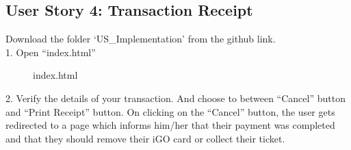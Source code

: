 \documentclass[12pt]{report}
\begin{document}
\FloatBarrier
\subsection{User Story 4: Transaction Receipt}
Download the folder ‘US\_Implementation’ from the github link. \\

1.	Open “index.html”
\begin{figure}[H]
	\caption{\label{fig:index}index.html}	
\end{figure}


2.	Verify the details of your transaction. And choose to between “Cancel” button and “Print Receipt” button. On clicking on the “Cancel” button, the user gets redirected to a page which informs him/her that their payment was completed and that they should remove their iGO card or collect their ticket. 
\end{document}
